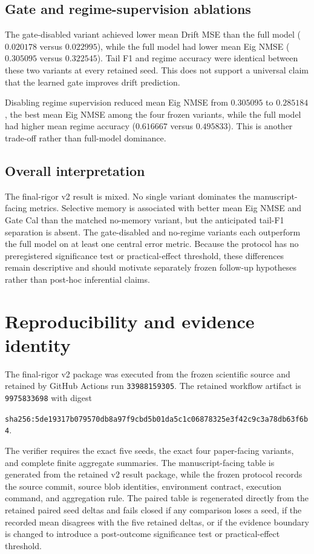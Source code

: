 \documentclass[11pt]{article}
\begin{document}
\subsection{Gate and regime-supervision ablations}
The gate-disabled variant achieved lower mean Drift MSE than the full model ($0.020178$ versus $0.022995$), while the full model had lower mean Eig NMSE ($0.305095$ versus $0.322545$). Tail F1 and regime accuracy were identical between these two variants at every retained seed. This does not support a universal claim that the learned gate improves drift prediction.

Disabling regime supervision reduced mean Eig NMSE from $0.305095$ to $0.285184$, the best mean Eig NMSE among the four frozen variants, while the full model had higher mean regime accuracy ($0.616667$ versus $0.495833$). This is another trade-off rather than full-model dominance.

\subsection{Overall interpretation}
The final-rigor v2 result is mixed. No single variant dominates the manuscript-facing metrics. Selective memory is associated with better mean Eig NMSE and Gate Cal than the matched no-memory variant, but the anticipated tail-F1 separation is absent. The gate-disabled and no-regime variants each outperform the full model on at least one central error metric. Because the protocol has no preregistered significance test or practical-effect threshold, these differences remain descriptive and should motivate separately frozen follow-up hypotheses rather than post-hoc inferential claims.

\section{Reproducibility and evidence identity}
The final-rigor v2 package was executed from the frozen scientific source and retained by GitHub Actions run \texttt{33988159305}. The retained workflow artifact is \texttt{9975833698} with digest
\begin{center}
\small\texttt{sha256:5de19317b079570db8a97f9cbd5b01da5c1c06878325e3f42c9c3a78db63f6b4}.
\end{center}
The verifier requires the exact five seeds, the exact four paper-facing variants, and complete finite aggregate summaries. The manuscript-facing table is generated from the retained v2 result package, while the frozen protocol records the source commit, source blob identities, environment contract, execution command, and aggregation rule. The paired table is regenerated directly from the retained paired seed deltas and fails closed if any comparison loses a seed, if the recorded mean disagrees with the five retained deltas, or if the evidence boundary is changed to introduce a post-outcome significance test or practical-effect threshold.
\end{document}

